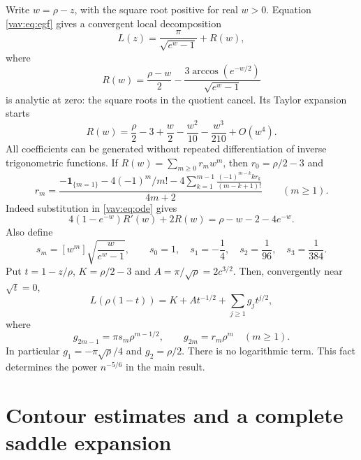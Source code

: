 \documentclass[11pt]{article}
\theoremstyle{remark}\newtheorem{remark}[theorem]{Remark}
\newcommand{\ind}[1]{\mathbf1_{\{#1\}}}
\begin{document}
Write $w=\rho-z$, with the square root positive for real $w>0$.
Equation \eqref{vav:eq:egf} gives a convergent local decomposition
\begin{equation}\label{vav:eq:local}
 L(z)=\frac\pi{\sqrt{e^w-1}}+R(w),
\end{equation}
where
\[
 R(w)=\frac{\rho-w}{2}
       -\frac{3\arccos(e^{-w/2})}{\sqrt{e^w-1}}
\]
is analytic at zero: the square roots in the quotient cancel.
Its Taylor expansion starts
\begin{equation}\label{vav:eq:Rexp}
 R(w)=\frac\rho2-3+\frac w2-\frac{w^2}{10}
                  -\frac{w^3}{210}+O(w^4).
\end{equation}
All coefficients can be generated without repeated differentiation of
inverse trigonometric functions. If $R(w)=\sum_{m\ge0}r_mw^m$, then
$r_0=\rho/2-3$ and
\begin{equation}\label{vav:eq:rrec}
 r_m=\frac{
 -\ind{m=1}-4(-1)^m/m!
 -4\displaystyle\sum_{k=1}^{m-1}
       \frac{(-1)^{m-k}kr_k}{(m-k+1)!}}
 {4m+2}\qquad(m\ge1).
\end{equation}
Indeed substitution in \eqref{vav:eq:ode} gives
\[
 4(1-e^{-w})R'(w)+2R(w)=\rho-w-2-4e^{-w}.
\]
Also define
\[
 s_m=[w^m]\sqrt{\frac w{e^w-1}},\qquad
 s_0=1,\quad s_1=-\frac14,\quad s_2=\frac1{96},\quad s_3=\frac1{384}.
\]
Put $t=1-z/\rho$, $K=\rho/2-3$ and $A=\pi/\sqrt\rho=2c^{3/2}$.
Then, convergently near $\sqrt t=0$,
\begin{equation}\label{vav:eq:puiseux}
 L(\rho(1-t))=K+A t^{-1/2}+\sum_{j\ge1}g_jt^{j/2},
\end{equation}
where
\begin{equation}\label{vav:eq:gj}
 g_{2m-1}=\pi s_m\rho^{m-1/2},\qquad
 g_{2m}=r_m\rho^m\quad(m\ge1).
\end{equation}
In particular $g_1=-\pi\sqrt\rho/4$ and $g_2=\rho/2$.
There is no logarithmic term. This fact determines the power
$n^{-5/6}$ in the main result.

\section{Contour estimates and a complete saddle expansion}\label{vav:sec:saddle}
\end{document}

